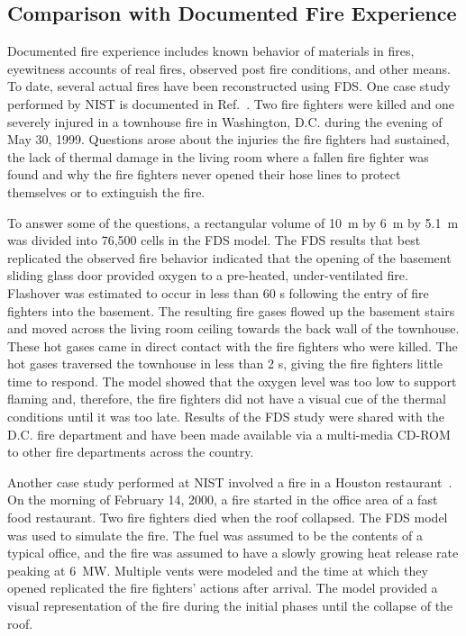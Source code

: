 \subsection{Comparison with Documented Fire Experience}

Documented fire experience includes known behavior of materials in fires, eyewitness accounts of real fires, observed post fire conditions, and other
means. To date, several actual fires have been reconstructed using FDS. One case study performed by NIST is documented in Ref.~\cite{Madrzykowski:1}.
Two fire fighters were killed and one severely injured in a townhouse fire in Washington, D.C. during the evening of May 30, 1999. Questions arose
about the injuries the fire fighters had sustained, the lack of thermal damage in the living room where a fallen fire fighter was found and why the
fire fighters never opened their hose lines to protect themselves or to extinguish the fire.

To answer some of the questions, a rectangular volume of 10~m by 6~m by 5.1~m was divided into 76,500 cells in the FDS model. The FDS results that
best replicated the observed fire behavior indicated that the opening of the basement sliding glass door provided oxygen to a pre-heated,
under-ventilated fire. Flashover was estimated to occur in less than 60 s following the entry of fire fighters into the basement. The resulting fire
gases flowed up the basement stairs and moved across the living room ceiling towards the back wall of the townhouse. These hot gases came in direct
contact with the fire fighters who were killed. The hot gases traversed the townhouse in less than 2 s, giving the fire fighters little time to
respond. The model showed that the oxygen level was too low to support flaming and, therefore, the fire fighters did not have a visual cue of the
thermal conditions until it was too late. Results of the FDS study were shared with the D.C. fire department and have been made available via a
multi-media CD-ROM to other fire departments across the country.

Another case study performed at NIST involved a fire in a Houston restaurant~\cite{Texas}. On the morning of February 14, 2000, a fire started in the
office area of a fast food restaurant. Two fire fighters died when the roof collapsed. The FDS model was used to simulate the fire. The fuel was
assumed to be the contents of a typical office, and the fire was assumed to have a slowly growing heat release rate peaking at 6~MW. Multiple vents
were modeled and the time at which they opened replicated the fire fighters' actions after arrival.  The model provided a visual representation of
the fire during the initial phases until the collapse of the roof.

